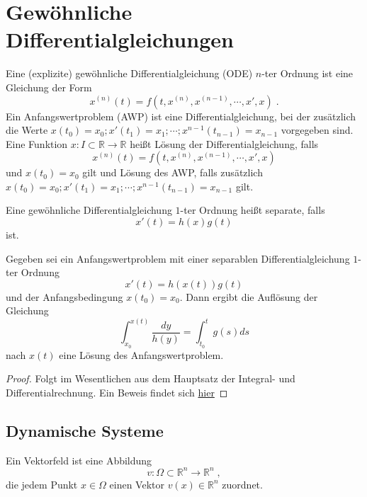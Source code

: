 \section{Gewöhnliche Differentialgleichungen}


\begin{Definition}
Eine (explizite) gewöhnliche Differentialgleichung (ODE) $n$-ter Ordnung ist eine Gleichung der Form
$$ x^{(n)}(t) = f(t, x^{(n)}, x^{(n-1)} , \cdots , x', x) \; .$$ 
Ein Anfangswertproblem (AWP) ist eine Differentialgleichung, bei der zusätzlich die Werte $x(t_0) = x_0 ; x'(t_1) = x_1; \cdots ; x^{n-1}(t_{n-1})= x_{n-1}  $ vorgegeben sind. Eine Funktion $x : I \subset \mathbb{R} \to \mathbb{R}$ heißt Lösung der Differentialgleichung, falls
$$ x^{(n)}(t) = f(t, x^{(n)}, x^{(n-1)} , \cdots , x', x) $$ und $x(t_0) = x_0$ gilt und Lösung des AWP, falls zusätzlich $x(t_0) = x_0 ; x'(t_1) = x_1; \cdots ; x^{n-1}(t_{n-1})= x_{n-1} $ gilt. 
\end{Definition}


\begin{Definition}
Eine gewöhnliche Differentialgleichung $1$-ter Ordnung heißt separate, falls
$$ x'(t) = h(x)g(t)$$ ist.
\end{Definition}


\begin{Satz}
Gegeben sei ein Anfangswertproblem mit einer separablen  Differentialgleichung $1$-ter Ordnung
$$ x'(t) = h(x(t))g(t)$$ und der Anfangsbedingung $x(t_0)= x_0$. Dann ergibt die Auflösung der Gleichung 
$$ \int_{x_0}^{x(t)} \frac{dy}{h(y)}  =  \int_{t_0}^{t} g(s) ds $$  nach $x(t)$ eine Lösung des Anfangswertproblem.
\end{Satz}
\begin{proof}
Folgt im Wesentlichen aus dem Hauptsatz der Integral- und Differentialrechnung.
Ein Beweis findet sich \href{https://de.wikipedia.org/wiki/Trennung_der\_Ver%C3%A4nderlichen}{hier}
\end{proof}
\subsection{Dynamische Systeme}

\begin{Definition}[Vektorfeld]
Ein Vektorfeld ist eine Abbildung $$v : \Omega \subset \mathbb{R}^n \to \mathbb{R}^n \; ,$$ die jedem Punkt $x  \in \Omega$ einen Vektor $v(x) \in \mathbb{R}^n$ zuordnet.
\end{Definition}

